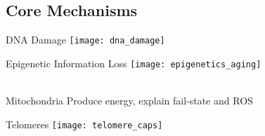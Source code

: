 \subsection{Core Mechanisms}


\begin{frame}[c]{DNA Damage}
    \texttt{[image: dna\_damage]} \\
    \cite{alhmoud2020dna}
\end{frame}

\begin{frame}[c]{Epigenetic Information Loss}
    \texttt{[image: epigenetics\_aging]} \\
    \cite{saul2021epigenetics} \\
\end{frame}


\begin{frame}[c]{Mitochondria}
    Produce energy, explain fail-state and ROS
\end{frame}

\begin{frame}[c]{Telomeres}
    \texttt{[image: telomere\_caps]} \\
    \cite{schmutz2016shelterin} \\
\end{frame}

